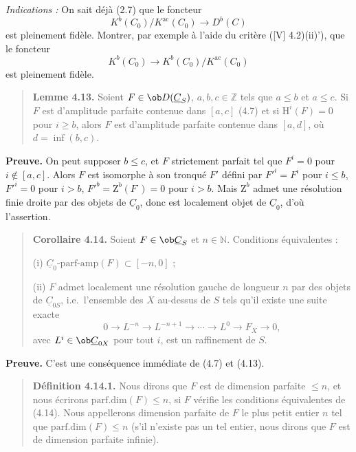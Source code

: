 \textit{Indications :} On sait déjà (2.7) que le foncteur
\[
K^b(C_0)/K^{\mathrm{ac}}(C_0) \longrightarrow D^b(C)
\]
est pleinement fidèle. Montrer, par exemple à l'aide du critère ([V] 4.2)(ii)'), que le foncteur
\[
K^b(C_0) \longrightarrow K^b(C_0)/K^{\mathrm{ac}}(C_0)
\]
est pleinement fidèle.

\begin{quote}
\textbf{Lemme 4.13.} Soient $F \in \ob D(\underline{C}_S)$, $a, b, c \in \mathbb{Z}$ tels que $a \leqslant b$ et $a \leqslant c$. Si $F$ est d'amplitude parfaite contenue dans $[a, c]$ (4.7) et si $\mathrm{H}^i(F) = 0$ pour $i \geqslant b$, alors $F$ est d'amplitude parfaite contenue dans $[a, d]$, où $d = \inf(b, c)$.
\end{quote}

\textbf{Preuve.} On peut supposer $b \leqslant c$, et $F$ strictement parfait tel que $F^i = 0$ pour $i \notin [a, c]$. Alors $F$ est isomorphe à son tronqué $F'$ défini par $F'^i = F^i$ pour $i \leqslant b$, $F'^i = 0$ pour $i > b$, $F'^b = \mathrm{Z}^b(F^\cdot) = 0$ pour $i > b$. Mais $\mathrm{Z}^b$ admet une résolution finie droite par des objets de $\underline{C}_0$, donc est localement objet de $\underline{C}_0$, d'où l'assertion.

\begin{quote}
\textbf{Corollaire 4.14.} Soient $F \in \ob \underline{C}_S$ et $n \in \mathbb{N}$. Conditions équivalentes :

(i) $\underline{C}_0\text{-parf-amp}(F) \subset [-n, 0]$ ;

(ii) $F$ admet localement une résolution gauche de longueur $n$ par des objets de $\underline{C}_{0S}$, i.e.\ l'ensemble des $X$ au-dessus de $S$ tels qu'il existe une suite exacte
\[
0 \longrightarrow L^{-n} \longrightarrow L^{-n+1} \longrightarrow \cdots \longrightarrow L^0 \longrightarrow F_X \longrightarrow 0,
\]
avec $L^i \in \ob \underline{C}_{0X}$ pour tout $i$, est un raffinement de $S$.
\end{quote}

\textbf{Preuve.} C'est une conséquence immédiate de (4.7) et (4.13).

\begin{quote}
\textbf{Définition 4.14.1.} Nous dirons que $F$ est de dimension parfaite $\leqslant n$, et nous écrirons $\mathrm{parf.dim}(F) \leqslant n$, si $F$ vérifie les conditions équivalentes de (4.14). Nous appellerons dimension parfaite de $F$ le plus petit entier $n$ tel que $\mathrm{parf.dim}(F) \leqslant n$ (s'il n'existe pas un tel entier, nous dirons que $F$ est de dimension parfaite infinie).
\end{quote}


